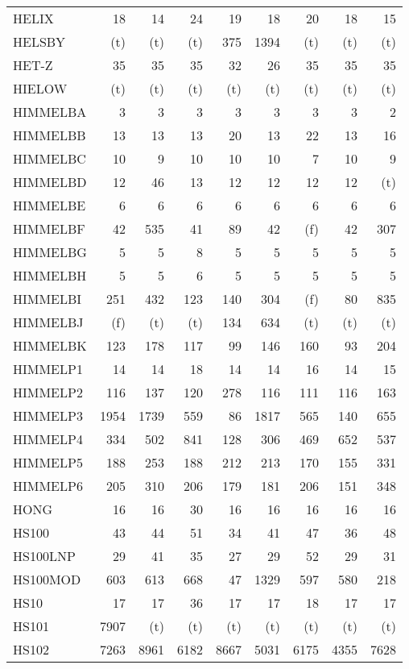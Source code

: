 \documentclass[11pt,twoside]{article}
\begin{document}
{\begin{longtable}[c]{|l|r|r|r|r|r|r|r|r|}
 HELIX & 18 & 14 & 24 & 19 & 18 & 20 & 18 & 15 \\
 HELSBY & (t) & (t) & (t) & 375 & 1394 & (t) & (t) & (t) \\
 HET-Z & 35 & 35 & 35 & 32 & 26 & 35 & 35 & 35 \\
 HIELOW & (t) & (t) & (t) & (t) & (t) & (t) & (t) & (t) \\
 HIMMELBA & 3 & 3 & 3 & 3 & 3 & 3 & 3 & 2 \\
 HIMMELBB & 13 & 13 & 13 & 20 & 13 & 22 & 13 & 16 \\
 HIMMELBC & 10 & 9 & 10 & 10 & 10 & 7 & 10 & 9 \\
 HIMMELBD & 12 & 46 & 13 & 12 & 12 & 12 & 12 & (t) \\
 HIMMELBE & 6 & 6 & 6 & 6 & 6 & 6 & 6 & 6 \\
 HIMMELBF & 42 & 535 & 41 & 89 & 42 & (f) & 42 & 307 \\
 HIMMELBG & 5 & 5 & 8 & 5 & 5 & 5 & 5 & 5 \\
 HIMMELBH & 5 & 5 & 6 & 5 & 5 & 5 & 5 & 5 \\
 HIMMELBI & 251 & 432 & 123 & 140 & 304 & (f) & 80 & 835 \\
 HIMMELBJ & (f) & (t) & (t) & 134 & 634 & (t) & (t) & (t) \\
 HIMMELBK & 123 & 178 & 117 & 99 & 146 & 160 & 93 & 204 \\
 HIMMELP1 & 14 & 14 & 18 & 14 & 14 & 16 & 14 & 15 \\
 HIMMELP2 & 116 & 137 & 120 & 278 & 116 & 111 & 116 & 163 \\
 HIMMELP3 & 1954 & 1739 & 559 & 86 & 1817 & 565 & 140 & 655 \\
 HIMMELP4 & 334 & 502 & 841 & 128 & 306 & 469 & 652 & 537 \\
 HIMMELP5 & 188 & 253 & 188 & 212 & 213 & 170 & 155 & 331 \\
 HIMMELP6 & 205 & 310 & 206 & 179 & 181 & 206 & 151 & 348 \\
 HONG & 16 & 16 & 30 & 16 & 16 & 16 & 16 & 16 \\
 HS100 & 43 & 44 & 51 & 34 & 41 & 47 & 36 & 48 \\
 HS100LNP & 29 & 41 & 35 & 27 & 29 & 52 & 29 & 31 \\
 HS100MOD & 603 & 613 & 668 & 47 & 1329 & 597 & 580 & 218 \\
 HS10 & 17 & 17 & 36 & 17 & 17 & 18 & 17 & 17 \\
 HS101 & 7907 & (t) & (t) & (t) & (t) & (t) & (t) & (t) \\
 HS102 & 7263 & 8961 & 6182 & 8667 & 5031 & 6175 & 4355 & 7628 \\

\end{longtable}}
\end{document}
